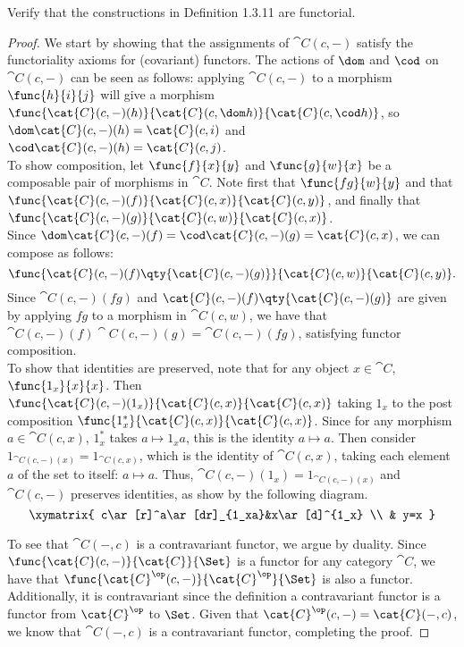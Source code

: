 \documentclass[../../main]{subfiles}
\begin{document}
\begin{exercise}
	Verify that the constructions in Definition 1.3.11 are functorial.
\end{exercise}

\begin{proof}
	We start by showing that the assignments of $\cat{C}(c,-)$ satisfy the
	functoriality axioms for (covariant) functors. The actions of $\dom$ and
	$\cod$ on $\cat{C}(c,-)$ can be seen as follows: applying $\cat{C}(c,-)$ to
	a morphism $\func{h}{i}{j}$ will give a morphism
	$\func{\cat{C}(c,-)(h)}{\cat{C}(c,\dom h)}{ \cat{C}(c,\cod h)}$, so
	$\dom\cat{C}(c,-)(h) = \cat{C}(c,i)$ and $\cod\cat{C}(c,-)(h) =
	\cat{C}(c,j)$. \\

	To show composition, let $\func{f}{x}{y}$ and $\func{g}{w}{x}$ be a
	composable pair of morphisms in $\cat{C}$. Note first that $\func{f
	g}{w}{y}$ and that $\func{\cat{C}(c,-)(f)}{\cat{C}(c,x)}{\cat{C}(c,y)}$, and
	finally that $\func{\cat{C}(c,-)(g)}{\cat{C}(c,w)}{\cat{C}(c,x)}$. \\ Since
	$\dom\cat{C}(c,-)(f) = \cod\cat{C}(c,-)(g) = \cat{C}(c,x)$, we can compose
	as follows: \[\func{\cat{C}(c,-)(f)
	\qty{\cat{C}(c,-)(g)}}{\cat{C}(c,w)}{\cat{C}(c,y)}.\] Since
	$\cat{C}(c,-)(f g)$ 
	and $ \cat{C}(c,-)(f)\qty{\cat{C}(c,-)(g)} $ 
	are given by applying $f g$ to a morphism in
	$\cat{C}(c,w)$, we have that $\cat{C}(c,-)(f) \cat{C}(c,-)(g) =
	\cat{C}(c,-)(f g)$, satisfying functor composition.\\

	To show that identities are preserved, note that for any object
	$x\in\cat{C}$, $\func{1_x}{x}{x}$. Then
	$\func{\cat{C}(c,-)(1_x)}{\cat{C}(c,x)}{\cat{C}(c,x)}$ taking $1_x$ to the
	post composition $\func{1^{*}_{x}}{\cat{C}(c,x)}{\cat{C}(c,x)}$. Since for
	any morphism $a\in\cat{C}(c,x)$, $1^{*}_x$ takes $a\mapsto 1_xa$, this is
	the identity $a\mapsto a$. Then consider $1_{\cat{C}(c,-)(x)} =
	1_{\cat{C}(c,x)}$, which is the identity of $\cat{C}(c,x)$, taking each
	element $a$ of the set to itself: $a\mapsto a$. Thus, $\cat{C}(c,-)(1_x) =
	1_{\cat{C}(c,-)(x)}$ and $\cat{C}(c,-)$ preserves identities, as show by the following diagram.\\
	\[\xymatrix{
		c\ar[r]^a\ar[dr]_{1_xa}&x\ar[d]^{1_x} \\
		& y=x
	}
	\]

	To see that $\cat{C}(-,c)$ is a contravariant functor, we argue by duality.
	Since $\func{\cat{C}(c,-)}{\cat{C}}{\Set}$ is a functor for any category
	$\cat{C}$, we have that $\func{\cat{C}^\op(c,-)}{\cat{C}^\op}{\Set}$ is also
	a functor. Additionally, it is contravariant since the definition a
	contravariant functor is a functor from $\cat{C}^\op$ to $\Set$. Given that
	$\cat{C}^\op(c,-) = \cat{C}(-,c)$, we know that $\cat{C}(-,c)$ is a
	contravariant functor, completing the proof.
\end{proof}
\end{document}

